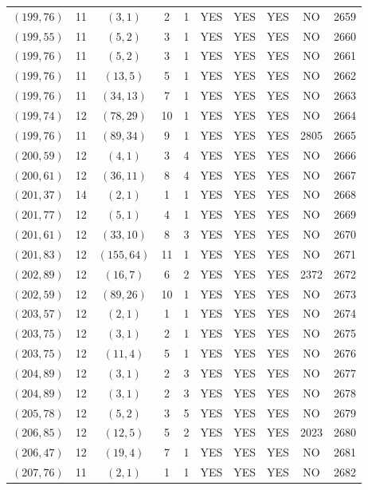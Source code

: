 \begin{longtable}{|c|c|c|c|c|c|c|c|c|c|}
$(199, 76)$ & 11 & $(3, 1)$ & 2 & 1 & YES & YES & YES & NO & 2659\\
$(199, 55)$ & 11 & $(5, 2)$ & 3 & 1 & YES & YES & YES & NO & 2660\\
$(199, 76)$ & 11 & $(5, 2)$ & 3 & 1 & YES & YES & YES & NO & 2661\\
$(199, 76)$ & 11 & $(13, 5)$ & 5 & 1 & YES & YES & YES & NO & 2662\\
$(199, 76)$ & 11 & $(34, 13)$ & 7 & 1 & YES & YES & YES & NO & 2663\\
$(199, 74)$ & 12 & $(78, 29)$ & 10 & 1 & YES & YES & YES & NO & 2664\\
$(199, 76)$ & 11 & $(89, 34)$ & 9 & 1 & YES & YES & YES & 2805 & 2665\\
$(200, 59)$ & 12 & $(4, 1)$ & 3 & 4 & YES & YES & YES & NO & 2666\\
$(200, 61)$ & 12 & $(36, 11)$ & 8 & 4 & YES & YES & YES & NO & 2667\\
$(201, 37)$ & 14 & $(2, 1)$ & 1 & 1 & YES & YES & YES & NO & 2668\\
$(201, 77)$ & 12 & $(5, 1)$ & 4 & 1 & YES & YES & YES & NO & 2669\\
$(201, 61)$ & 12 & $(33, 10)$ & 8 & 3 & YES & YES & YES & NO & 2670\\
$(201, 83)$ & 12 & $(155, 64)$ & 11 & 1 & YES & YES & YES & NO & 2671\\
$(202, 89)$ & 12 & $(16, 7)$ & 6 & 2 & YES & YES & YES & 2372 & 2672\\
$(202, 59)$ & 12 & $(89, 26)$ & 10 & 1 & YES & YES & YES & NO & 2673\\
$(203, 57)$ & 12 & $(2, 1)$ & 1 & 1 & YES & YES & YES & NO & 2674\\
$(203, 75)$ & 12 & $(3, 1)$ & 2 & 1 & YES & YES & YES & NO & 2675\\
$(203, 75)$ & 12 & $(11, 4)$ & 5 & 1 & YES & YES & YES & NO & 2676\\
$(204, 89)$ & 12 & $(3, 1)$ & 2 & 3 & YES & YES & YES & NO & 2677\\
$(204, 89)$ & 12 & $(3, 1)$ & 2 & 3 & YES & YES & YES & NO & 2678\\
$(205, 78)$ & 12 & $(5, 2)$ & 3 & 5 & YES & YES & YES & NO & 2679\\
$(206, 85)$ & 12 & $(12, 5)$ & 5 & 2 & YES & YES & YES & 2023 & 2680\\
$(206, 47)$ & 12 & $(19, 4)$ & 7 & 1 & YES & YES & YES & NO & 2681\\
$(207, 76)$ & 11 & $(2, 1)$ & 1 & 1 & YES & YES & YES & NO & 2682\\

\end{longtable}
